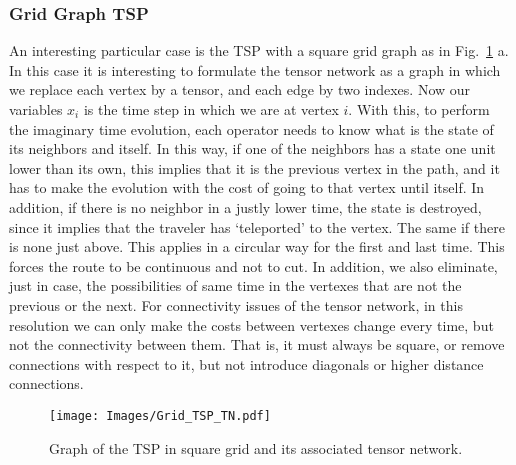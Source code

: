 \subsubsection{Grid Graph TSP}
An interesting particular case is the TSP with a square grid graph as in Fig.~\ref{fig: Grid_TSP_TN} a. In this case it is interesting to formulate the tensor network as a graph in which we replace each vertex by a tensor, and each edge by two indexes. Now our variables $x_i$ is the time step in which we are at vertex $i$.  With this, to perform the imaginary time evolution, each operator needs to know what is the state of its neighbors and itself. In this way, if one of the neighbors has a state one unit lower than its own, this implies that it is the previous vertex in the path, and it has to make the evolution with the cost of going to that vertex until itself. In addition, if there is no neighbor in a justly lower time, the state is destroyed, since it implies that the traveler has `teleported' to the vertex. The same if there is none just above. This applies in a circular way for the first and last time. This forces the route to be continuous and not to cut. In addition, we also eliminate, just in case, the possibilities of same time in the vertexes that are not the previous or the next. For connectivity issues of the tensor network, in this resolution we can only make the costs between vertexes change every time, but not the connectivity between them. That is, it must always be square, or remove connections with respect to it, but not introduce diagonals or higher distance connections.

\begin{figure}[h]
    \centering
    \texttt{[image: Images/Grid\_TSP\_TN.pdf]}
    \caption{Graph of the TSP in square grid and its associated tensor network.}
    \label{fig: Grid_TSP_TN}
\end{figure}

